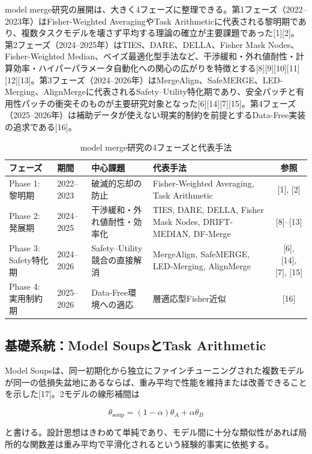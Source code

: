 \documentclass{article}
\begin{document}
model merge研究の展開は、大きく4フェーズに整理できる。第1フェーズ（2022–2023年）はFisher-Weighted AveragingやTask Arithmeticに代表される黎明期であり、複数タスクモデルを壊さず平均する理論の確立が主要課題であった[1][2]。第2フェーズ（2024–2025年）はTIES、DARE、DELLA、Fisher Mask Nodes、Fisher-Weighted Median、ベイズ最適化型手法など、干渉緩和・外れ値耐性・計算効率・ハイパーパラメータ自動化への関心の広がりを特徴とする[8][9][10][11][12][13]。第3フェーズ（2024–2026年）はMergeAlign、SafeMERGE、LED-Merging、AlignMergeに代表されるSafety–Utility特化期であり、安全パッチと有用性パッチの衝突そのものが主要研究対象となった[6][14][7][15]。第4フェーズ（2025–2026年）は補助データが使えない現実的制約を前提とするData-Free実装の追求である[16]。
\begin{table}[H]
\centering
\caption{model merge研究の4フェーズと代表手法}
\label{tab:merge-phases}
\small
\begin{tabular}{p{2.3cm}p{1.8cm}p{3.2cm}p{5.2cm}c}
\toprule
フェーズ & 期間 & 中心課題 & 代表手法 & 参照 \\
\midrule
Phase 1: 黎明期 & 2022--2023 & 破滅的忘却の防止 & Fisher-Weighted Averaging, Task Arithmetic & [1], [2] \\

Phase 2: 発展期 & 2024--2025 & 干渉緩和・外れ値耐性・効率化 & TIES, DARE, DELLA, Fisher Mask Nodes, DRIFT-MEDIAN, DF-Merge & [8]--[13] \\

Phase 3: Safety特化期 & 2024--2026 & Safety--Utility競合の直接解消 & MergeAlign, SafeMERGE, LED-Merging, AlignMerge & [6], [14], [7], [15] \\

Phase 4: 実用制約期 & 2025--2026 & Data-Free環境への適応
& 層適応型Fisher近似 & [16] \\
\bottomrule
\end{tabular}
\end{table}

\subsection{基礎系統：Model SoupsとTask Arithmetic}

Model Soupsは、同一初期化から独立にファインチューニングされた複数モデルが同一の低損失盆地にあるならば、重み平均で性能を維持または改善できることを示した[17]。2モデルの線形補間は

\[
\theta_{\mathrm{soup}}=(1-\alpha)\theta_A+\alpha\theta_B
\tag{1}
\]

と書ける。設計思想はきわめて単純であり、モデル間に十分な類似性があれば局所的な関数差は重み平均で平滑化されるという経験的事実に依拠する。
\end{document}
